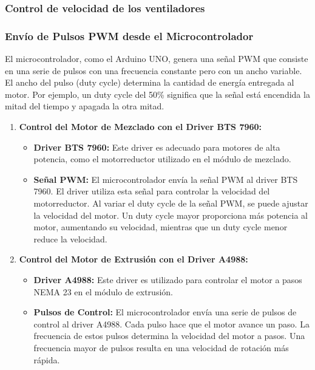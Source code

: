\documentclass[14pt,oneside]{extarticle} %
\begin{document}
\subsubsection{Control de velocidad de los ventiladores}

\subsubsection{Envío de Pulsos PWM desde el Microcontrolador}

El microcontrolador, como el Arduino UNO, genera una señal PWM que consiste en una serie de pulsos con una frecuencia constante pero con un ancho variable. El ancho del pulso (duty cycle) determina la cantidad de energía entregada al motor. Por ejemplo, un duty cycle del 50\% significa que la señal está encendida la mitad del tiempo y apagada la otra mitad.

    \newpage
    \begin{enumerate}
    \item \textbf{Control del Motor de Mezclado con el Driver BTS 7960:}
    \begin{itemize}
        \item \textbf{Driver BTS 7960:} Este driver es adecuado para motores de alta potencia, como el motorreductor utilizado en el módulo de mezclado.
        \item \textbf{Señal PWM:} El microcontrolador envía la señal PWM al driver BTS 7960. El driver utiliza esta señal para controlar la velocidad del motorreductor. Al variar el duty cycle de la señal PWM, se puede ajustar la velocidad del motor. Un duty cycle mayor proporciona más potencia al motor, aumentando su velocidad, mientras que un duty cycle menor reduce la velocidad.
    \end{itemize}

    \item \textbf{Control del Motor de Extrusión con el Driver A4988:}
    \begin{itemize}
        \item \textbf{Driver A4988:} Este driver es utilizado para controlar el motor a pasos NEMA 23 en el módulo de extrusión.
        \item \textbf{Pulsos de Control:} El microcontrolador envía una serie de pulsos de control al driver A4988. Cada pulso hace que el motor avance un paso. La frecuencia de estos pulsos determina la velocidad del motor a pasos. Una frecuencia mayor de pulsos resulta en una velocidad de rotación más rápida.
    \end{itemize}
\end{enumerate}
\end{document}
